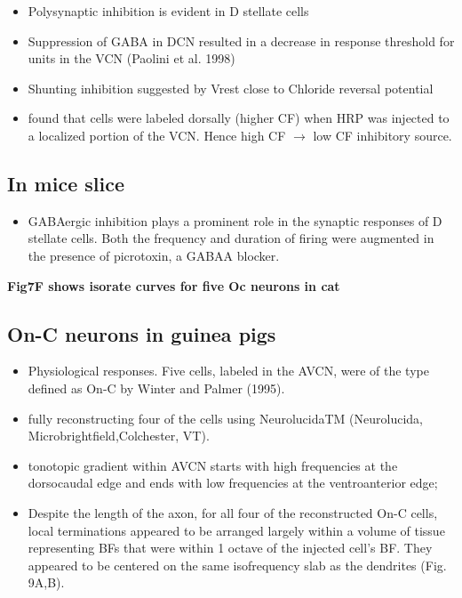 \documentclass[10pt,a4paper]{article}
\begin{document}
\begin{itemize}
\item Polysynaptic inhibition is evident in D stellate cells
  \citep{FerragamoGoldingEtAl:1998a,PaoliniClark:1999, PaoliniClark:1998}
\item Suppression of GABA in DCN resulted in a decrease in response threshold
  for units in the VCN (Paolini et al. 1998)
\item Shunting inhibition suggested by \citep{SmithRhode:1989} Vrest close to
  Chloride reversal potential
\item \citep{WickesbergOertel:1988} found that cells were labeled dorsally
  (higher CF) when HRP was injected to a localized portion of the VCN. Hence
  high CF \ensuremath{\rightarrow} low CF inhibitory source.
\end{itemize}

\subsection{In mice slice \citep{FerragamoGoldingEtAl:1998a}}


\begin{itemize}
\item GABAergic inhibition plays a prominent role in the synaptic responses of D
  stellate cells. Both the frequency and duration of firing were augmented in
  the presence of picrotoxin, a GABAA blocker.
\end{itemize}
\citep{RhodeSmith:1986}

{\bfseries Fig7F \citep{RhodeSmith:1986} shows isorate curves for five Oc
  neurons in cat}

\subsection{On-C neurons \citep{ArnottWallaceEtAl:2004} in guinea pigs}


\begin{itemize}
\item Physiological responses. Five cells, labeled in the AVCN, were of the type
  defined as On-C by Winter and Palmer (1995).
\item fully reconstructing four of the cells using NeurolucidaTM (Neurolucida,
  Microbrightfield,Colchester, VT).
\item tonotopic gradient within AVCN starts with high frequencies at the
  dorsocaudal edge and ends with low frequencies at the ventroanterior edge;
\item Despite the length of the axon, for all four of the reconstructed On-C
  cells, local terminations appeared to be arranged largely within a volume of
  tissue representing BFs that were within 1 octave of the injected
  cell{\textquoteright}s BF. They appeared to be centered on the same
  isofrequency slab as the dendrites (Fig. 9A,B).
\end{itemize}
\end{document}
